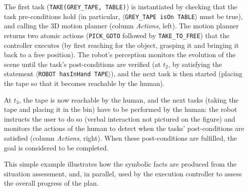 \documentclass[preprint,3p,times]{elsarticle}
\newcommand{\concept}[1]{{\small \texttt{#1}}}
\newcommand{\stmt}[1]{{\footnotesize\tt$\langle$#1\relax$\rangle$}}
\begin{document}
The first task (\concept{TAKE(GREY\_TAPE, TABLE)}) is instantiated by checking
that the task pre-conditions hold (in particular, \stmt{GREY\_TAPE isOn TABLE}
must be true), and calling the 3D motion planner (column \emph{Actions},
left). The motion planner returns two atomic actions ({\tt PICK\_GOTO} followed
by {\tt TAKE\_TO\_FREE}) that the controller executes (by first reaching for
the object, grasping it and bringing it back to a free position).  The robot's
perception monitors the evolution of the scene until the task's post-conditions
are verified (at $t_2$, by satisfying the statement \stmt{ROBOT hasInHand
TAPE}), and the next task is then started (placing the tape so that it becomes
reachable by the human).

At $t_3$, the tape is now reachable by the human, and the next tasks (taking the
tape and placing it in the bin) have to be performed by the human: the robot
instructs the user to do so (verbal interaction not pictured on the figure) and
monitors the actions of the human to detect when the tasks' post-conditions are
satisfied (column \emph{Actions}, right). When these post-conditions are
fulfilled, the goal is considered to be completed.

This simple example illustrates how the symbolic facts are produced from the
situation assessment, and, in parallel, used by the execution controller to
assess the overall progress of the plan.
\end{document}

